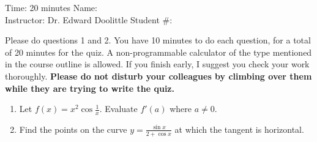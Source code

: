 \documentclass[12pt]{article}
\newcommand{\ds}{\displaystyle}
\begin{document}
\thispagestyle{plain}

\begin{flushleft}
Time:  20 minutes                \hfill       Name: \underline{\hspace{2in}} \\
Instructor: Dr. Edward Doolittle \hfill Student \#: \underline{\hspace{2in}}
\end{flushleft}

\noindent
Please do questions 1 and 2.  You have 10 minutes
to do each question, for a total of 20
minutes for the quiz.  A non-programmable
calculator of the type mentioned in the course outline is allowed.
If you finish early, I suggest you check your work thoroughly.
\textbf{Please do not disturb your colleagues by climbing over them while
they are trying to write the quiz.}

\begin{enumerate}
\item Let
  $\ds f(x)=x^2 \cos \frac{1}{x}$.
  Evaluate $f'(a)$ where $a\ne 0$.
\newpage
\item Find 
  the points on the curve $\ds y=\frac{\sin x}{2+\cos x}$ at which
  the tangent is horizontal.
\end{enumerate}
\end{document}
